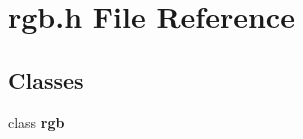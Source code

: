 \section{rgb.h File Reference}
\label{rgb_8h}
\subsection*{Classes}
\begin{CompactItemize}
\item 
class {\bf rgb}
\end{CompactItemize}
